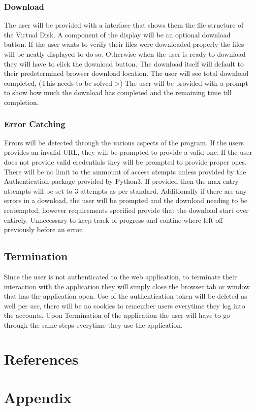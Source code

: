 \documentclass{article}
\begin{document}
            \subsubsection{Download}
            The user will be provided with a interface that shows them the file structure of the Virtual Disk. A component of the display will be an optional download button. If the user wants to verify
            their files were downloaded properly the files will be neatly displayed to do so. Otherwise when the user is ready to download they will have to click the download button. The download itself 
            will default to their predetermined browser download location. The user will see total download completed, (This needs to be solved->) The user will be provided with a prompt to show how much
            the download has completed and the remaining time till completion.

            \subsubsection{Error Catching}
            Errors will be detected through the various aspects of the program. If the users provides an invalid URL, they will be prompted to provide a valid one. If the user does not provide valid credentials
            they will be prompted to provide proper ones. There will be no limit to the ammount of access atempts unless provided by the Authentication package provided by Python3. If provided then the max entry
            attempts will be set to 3 attempts as per standard. Additionally if there are any errors in a download, the user will be prompted and the download needing to be reatempted, however requirements specified
            provide that the download start over entirely. Unnecessary to keep track of progress and contine where left off previously before an error.

        \subsection{Termination}
        Since the user is not authenticated to the web application, to terminate their interaction with the application they will simply close the browser tab or window that has the
        application open. Use of the authentication token will be deleted as well per use, there will be no cookies to remember users everytime they log into the accounts. Upon Termination
        of the application the user will have to go through the same steps everytime they use the application.


    \section*{References}

    \appendix
    \section{Appendix}
\end{document}

